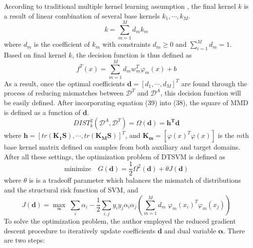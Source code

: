 \noindent According to traditional multiple kernel learning assumption \cite{lanckriet2004learning}, the final kernel $k$ is a result of linear combination of several base kernels $k_1, \cdots, k_M$.
\begin{equation}
k = \sum_{m=1}^{M}d_m k_m
\end{equation}
where $d_m$ is the coefficient of $k_m$ with constraints $d_m \geq 0$ and $\sum_{i=1}^{M}d_m = 1$. Based on final kernel $k$, the decision function is thus defined as
\begin{equation}
f^T(x) = \sum_{m=1}^{M} d_m w_m^T \varphi_m(x) + b 
\end{equation}
As a result, once the optimal coefficients $\mathbf{d}=[d_1, \cdots, d_M]^T$ are found through the process of reducing mismatches between $\mathcal{D}^T$ and $\mathcal{D}^A$, this decision function will be easily defined. After incorporating equation (39) into (38), the square of MMD is defined as a function of $\mathbf{d}$.
\begin{equation}
DIST_k^2(\mathcal{D}^A, \mathcal{D}^T) = \Omega(\mathbf{d}) = \mathbf{h^T d}
\end{equation}
where $\mathbf{h} = [tr(\mathbf{K_1 S}), \cdots, tr(\mathbf{K_MS})]^T$, and $\mathbf{K_m} = [\varphi(x)^T \varphi(x)]$ is the $m$th base kernel matrix defined on samples from both auxiliary and target domains. After all these settings, the optimization problem of DTSVM is defined as 
\begin{equation}
\text{minimize} \quad G(\mathbf{d}) = \frac{1}{2} \Omega^2(\mathbf{d}) + \theta J(\mathbf{d})
\end{equation}
where $\theta$ is is a tradeoff parameter which balances the mismatch of distributions and the structural risk function of SVM, and 
  \begin{equation}
  J(\mathbf{d}) = \underset{\boldsymbol{\alpha}}{\max} \; \sum_i \alpha_i - \frac{1}{2} \sum_{i,j} y_i y_j \alpha_i \alpha_j  (\sum_{m=1}^M d_m \; \varphi_m (x_i) ^T \varphi_m (x_j))           
  \end{equation}
To solve the optimization problem, the author \cite{duan2009domain} employed the reduced gradient descent procedure to iteratively update coefficients $\mathbf{d}$ and dual variable $\boldsymbol{\alpha}$. There are two steps:
